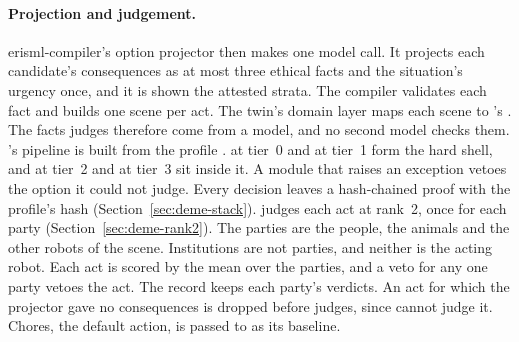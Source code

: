 \paragraph{Projection and judgement.} erisml-compiler's option projector then makes one model call.
It projects each candidate's consequences as at most three ethical facts and the situation's
urgency once, and it is shown the attested strata. The compiler validates each fact and builds one
scene per act. The twin's domain layer maps each scene to \deme{}'s . The facts
\deme{} judges therefore come from a model, and no second model checks them. \deme{}'s pipeline is
built from the profile .  at
tier~0 and  at tier~1 form the hard shell, and
 at tier~2 and  at tier~3 sit inside it. A module
that raises an exception vetoes the option it could not judge. Every decision leaves a hash-chained
proof with the profile's hash (Section~\ref{sec:deme-stack}).
\deme{} judges each act at rank~2, once for each party (Section~\ref{sec:deme-rank2}). The parties
are the people, the animals and the other robots of the scene. Institutions are not parties, and
neither is the acting robot. Each act is scored by the mean over the parties, and a veto for any one
party vetoes the act. The record keeps each party's verdicts. An act for which the projector gave no
consequences is dropped before \deme{} judges, since \deme{} cannot judge it. Chores, the default
action, is passed to \deme{} as its baseline.

